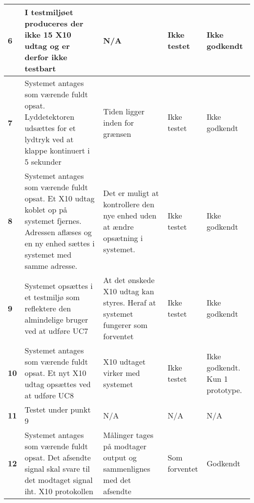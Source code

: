 \begin{center}
\begin{longtable}{|p{}|p{}|p{}|p{}|p{}|}
\textbf{6} &
I testmiljøet produceres der ikke 15 X10 udtag og er derfor ikke testbart &
N/A  
&Ikke \newline testet
&Ikke \newline godkendt
 \\\hline

\textbf{7} &
Systemet antages som værende fuldt opsat.\newline
Lyddetektoren udsættes for et lydtryk ved at klappe kontinuert i 5 sekunder &
Tiden ligger inden for grænsen
&Ikke \newline testet
&Ikke \newline godkendt 
 \\\hline

\textbf{8} &
Systemet antages som værende fuldt opsat.\newline
Et X10 udtag koblet op på systemet fjernes. Adressen aflæses og en ny enhed sættes i systemet med samme adresse.&
Det er muligt at kontrollere den nye enhed uden at ændre opsætning i systemet.
&Ikke \newline testet
&Ikke \newline godkendt 
 \\\hline

\textbf{9} &
Systemet opsættes i et testmiljø som reflektere den almindelige bruger ved at udføre UC7&
At det ønskede X10 udtag kan styres. Heraf at systemet fungerer som forventet
&Ikke \newline testet
&Ikke \newline godkendt 
 \\\hline

\textbf{10} &
Systemet antages som værende fuldt opsat.\newline
Et nyt X10 udtag opsættes ved at udføre UC8 &
X10 udtaget virker med systemet
&Ikke \newline testet
&Ikke \newline godkendt. \newline Kun 1 prototype.
 \\\hline

\textbf{11} &
Testet under punkt 9&
N/A &
N/A &
N/A \\\hline

\textbf{12} &
Systemet antages som værende fuldt opsat.\newline
Det afsendte signal skal svare til det modtaget signal iht. X10 protokollen&
Målinger tages på modtager output og sammenlignes med det afsendte
&Som \newline forventet
&Godkendt
 \\\hline


\end{longtable}
\end{center}
